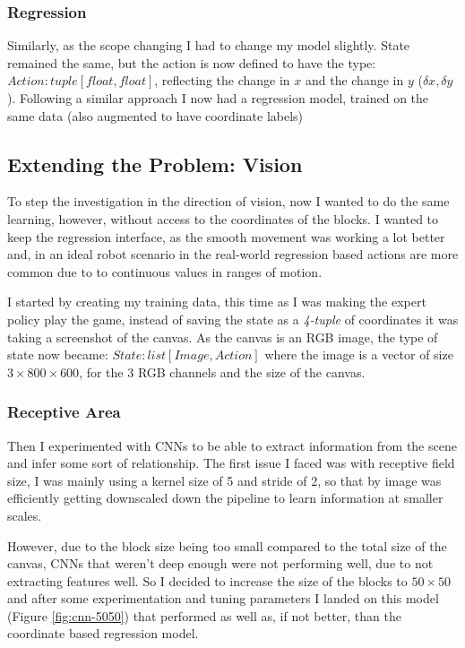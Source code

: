 \subsubsection{Regression}
Similarly, as the scope changing I had to change my model slightly. State remained the same, but the action is now defined to have the type: \(Action: tuple[float, float]\), reflecting the change in $x$ and the change in $y$ (\(\delta x , \delta y\)).
Following a similar approach I now had a regression model, trained on the same data (also augmented to have coordinate labels)


\subsection{Extending the Problem: Vision}
To step the investigation in the direction of vision, now I wanted to do the same learning, however, without access to the coordinates of the blocks. I wanted to keep the regression interface, as the smooth movement was working a lot better and, in an ideal robot scenario in the real-world regression based actions are more common due to to continuous values in ranges of motion.

I started by creating my training data, this time as I was making the expert policy play the game, instead of saving the state as a \emph{4-tuple} of coordinates it was taking a screenshot of the canvas. As the canvas is an RGB image, the type of state now became: $State: list[Image, Action]$ where the image is a vector of size $3 \times 800 \times 600$, for the 3 RGB channels and the size of the canvas.

\subsubsection{Receptive Area}
Then I experimented with CNNs to be able to extract information from the scene and infer some sort of relationship. The first issue I faced was with receptive field size, I was mainly using a kernel size of 5 and stride of 2, so that by image was efficiently getting downscaled down the pipeline to learn information at smaller scales. 

However, due to the block size being too small compared to the total size of the canvas, CNNs that weren't deep enough were not performing well, due to not extracting features well. So I decided to increase the size of the blocks to $50 \times 50$ and after some experimentation and tuning parameters I landed on this model (Figure \ref{fig:cnn-5050}) that performed as well as, if not better, than the coordinate based regression model.


